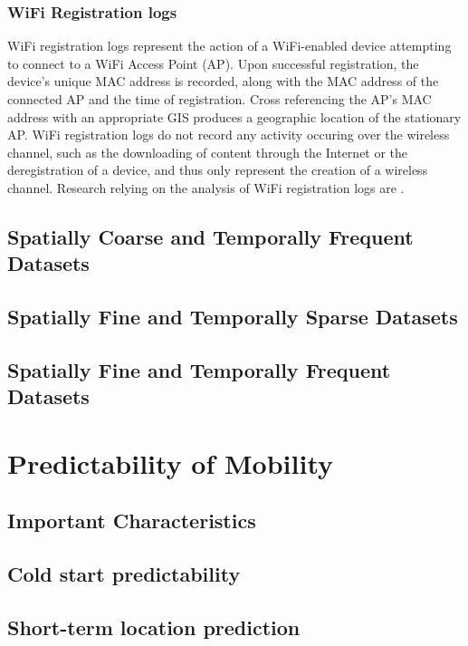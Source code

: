 \documentclass[journal]{IEEEtran}
\begin{document}
\subsubsection{WiFi Registration logs}

WiFi registration logs represent the action of a WiFi-enabled device attempting to connect to a WiFi Access Point (AP). Upon successful registration, the device's unique MAC address is recorded, along with the MAC address of the connected AP and the time of registration. Cross referencing the AP's MAC address with an appropriate GIS produces a geographic location of the stationary AP. WiFi registration logs do not record any activity occuring over the wireless channel, such as the downloading of content through the Internet or the deregistration of a device, and thus only represent the creation of a wireless channel. Research relying on the analysis of WiFi registration logs are \cite{song_evaluating_2006, zhang_nextcell:_2013}.

\subsection{Spatially Coarse and Temporally Frequent Datasets}

\subsection{Spatially Fine and Temporally Sparse Datasets}

\subsection{Spatially Fine and Temporally Frequent Datasets}



\section{Predictability of Mobility} \label{sec:predict}

\subsection{Important Characteristics}

\subsection{Cold start predictability}

\subsection{Short-term location prediction}
\end{document}
